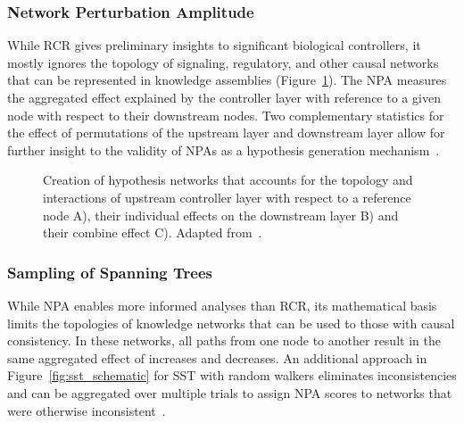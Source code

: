 \subsubsection{Network Perturbation Amplitude}

While \ac{RCR} gives preliminary insights to significant biological controllers, it mostly ignores the topology of signaling, regulatory, and other causal networks that can be represented in knowledge assemblies (Figure~\ref{fig:npa_schematic}).
The \ac{NPA} measures the aggregated effect explained by the controller layer with reference to a given node with respect to their downstream nodes.
Two complementary statistics for the effect of permutations of the upstream layer and downstream layer allow for further insight to the validity of \ac{NPA}s as a hypothesis generation mechanism~\cite{Martin2014}.

\begin{figure}
\captionsetup{format=plain}
\caption[Hypothesis Network Generation for Network Perturbation Amplitude]{Creation of hypothesis networks that accounts for the topology and interactions of  upstream controller layer with respect to a reference node A), their individual effects on the downstream layer B) and their combine effect C). Adapted from~\cite{Martin2012}.}
\label{fig:npa_schematic}
\end{figure}

\subsubsection{Sampling of Spanning Trees}

While \ac{NPA} enables more informed analyses than \ac{RCR}, its mathematical basis limits the topologies of knowledge networks that can be used to those with causal consistency.
In these networks, all paths from one node to another result in the same aggregated effect of increases and decreases.
An additional approach in Figure~\ref{fig:sst_schematic} for \ac{SST} with random walkers eliminates inconsistencies and can be aggregated over multiple trials to assign \ac{NPA} scores to networks that were otherwise inconsistent~\cite{Vasilyev2014}.

